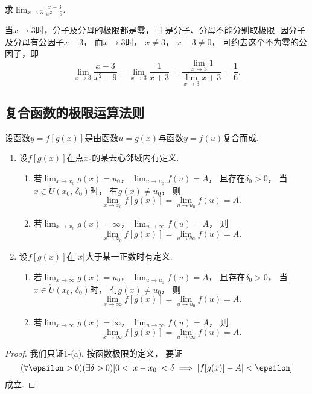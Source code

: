 \begin{example}
求\(\lim_{x\to3}\frac{x-3}{x^2-9}\).
\begin{solution}
当\(x\to3\)时，分子及分母的极限都是零，
于是分子、分母不能分别取极限.
因分子及分母有公因子\(x - 3\)，
而\(x\to3\)时，
\(x \neq 3\)，
\(x - 3 \neq 0\)，
可约去这个不为零的公因子，即\[
	\lim_{x\to3}\frac{x - 3}{x^2 - 9}
	= \lim_{x\to3}\frac{1}{x + 3}
	= \frac{\lim_{x\to3} 1}{\lim_{x\to3} x+3}
	= \frac{1}{6}.
\]
\end{solution}
\end{example}

\subsection{复合函数的极限运算法则}
\begin{theorem}
设函数\(y=f[g(x)]\)是由函数\(u=g(x)\)与函数\(y=f(u)\)复合而成.
\begin{enumerate}
	\item 设\(f[g(x)]\)在点\(x_0\)的某去心邻域内有定义.
	\begin{enumerate}[label={\rm(\roman*)}]
		\item 若\(\lim_{x \to x_0} g(x) = u_0\)，
		\(\lim_{u \to u_0} f(u) = A\)，
		且存在\(\delta_0 > 0\)，
		当\(x \in \mathring{U}(x_0,\,\delta_0)\)时，
		有\(g(x) \neq u_0\)，
		则\[
			\lim_{x \to x_0} f[g(x)]
			= \lim_{u \to u_0} f(u) = A.
		\]
		\item 若\(\lim_{x \to x_0}g(x) = \infty\)，
		\(\lim_{u \to \infty}f(u) = A\)，
		则\[
			\lim_{x \to x_0} f[g(x)]
			= \lim_{u \to \infty} f(u) = A.
		\]
	\end{enumerate}

	\item 设\(f[g(x)]\)在\(\abs{x}\)大于某一正数时有定义.
	\begin{enumerate}[label={\rm(\roman*)}]
	\item 若\(\lim_{x \to \infty} g(x) = u_0\)，
	\(\lim_{u \to u_0} f(u) = A\)，
	且存在\(\delta_0 > 0\)，
	当\(x \in \mathring{U}(x_0,\,\delta_0)\)时，
	有\(g(x) \neq u_0\)，
	则\[
		\lim_{x \to \infty} f[g(x)]
		= \lim_{u \to u_0} f(u) = A.
	\]

	\item 若\(\lim_{x \to \infty}g(x) = \infty\)，
	\(\lim_{u \to \infty}f(u) = A\)，
	则\[
		\lim_{x \to \infty} f[g(x)]
		= \lim_{u \to \infty} f(u) = A.
	\]
	\end{enumerate}
\end{enumerate}
\begin{proof}
我们只证1-(a).
按函数极限的定义，
要证\[
	(\forall\epsilon>0)
	(\exists\delta>0)
	[
		0 < \abs{x - x_0} < \delta
		\implies
		\abs{ f[g(x)] - A } < \epsilon
	]
\]成立.


\end{proof}
\end{theorem}
